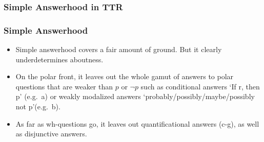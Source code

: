 \documentclass{beamer}
\newcommand{\bit}{\begin{itemize}}
\newcommand{\eit}{\end{itemize}}
\begin{document}
\begin{frame}\frametitle{    Simple Answerhood in TTR   }

\end{frame}

\begin{frame}\frametitle{ Simple Answerhood     }
\bit

\item Simple answerhood covers a fair amount of ground.  But it clearly
underdetermines aboutness.  
\item On the polar front, it leaves out the
whole gamut of answers to polar questions that are weaker than $p$ or
$\neg p$ such as conditional answers `If r, then p' (e.g.\ a) or
weakly modalized answers `probably/possibly/maybe/possibly not
p'(e.g.\ b).  
\item As far as wh-questions go, it leaves out
quantificational answers (c-g), as well as disjunctive answers.


\eit
\end{frame}
\end{document}
